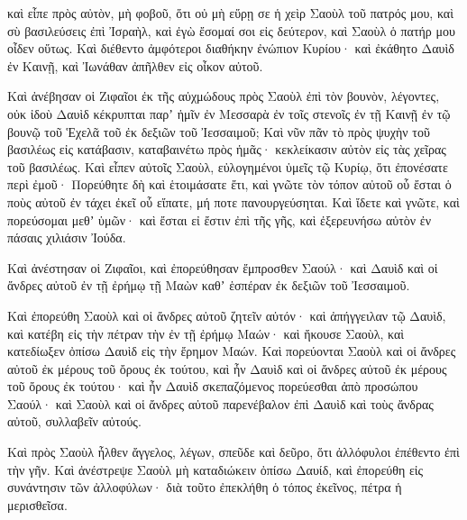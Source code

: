 {καὶ εἶπε πρὸς αὐτὸν, μὴ φοβοῦ, ὅτι οὐ μὴ εὕρῃ σε ἡ χεὶρ Σαοὺλ τοῦ πατρός μου, καὶ σὺ βασιλεύσεις ἐπὶ Ἰσραὴλ, καὶ ἐγὼ ἔσομαί σοι εἰς δεύτερον, καὶ Σαοὺλ ὁ πατήρ μου οἶδεν οὕτως.
Καὶ διέθεντο ἀμφότεροι διαθήκην ἐνώπιον Κυρίου· καὶ ἐκάθητο Δαυὶδ ἐν Καινῇ, καὶ Ἰωνάθαν ἀπῆλθεν εἰς οἶκον αὐτοῦ.
\par }{\PP {}Καὶ ἀνέβησαν οἱ Ζιφαῖοι ἐκ τῆς αὐχμώδους πρὸς Σαοὺλ ἐπὶ τὸν βουνὸν, λέγοντες, οὐκ ἰδοὺ Δαυὶδ κέκρυπται παρʼ ἡμῖν ἐν Μεσσαρὰ ἐν τοῖς στενοῖς ἐν τῇ Καινῇ ἐν τῷ βουνῷ τοῦ Ἑχελᾶ τοῦ ἐκ δεξιῶν τοῦ Ἰεσσαιμοῦ;
Καὶ νῦν πᾶν τὸ πρὸς ψυχὴν τοῦ βασιλέως εἰς κατάβασιν, καταβαινέτω πρὸς ἡμᾶς· κεκλείκασιν αὐτὸν εἰς τὰς χεῖρας τοῦ βασιλέως.
Καὶ εἶπεν αὐτοῖς Σαοὺλ, εὐλογημένοι ὑμεῖς τῷ Κυρίῳ, ὅτι ἐπονέσατε περὶ ἐμοῦ·
Πορεύθητε δὴ καὶ ἑτοιμάσατε ἔτι, καὶ γνῶτε τὸν τόπον αὐτοῦ οὗ ἔσται ὁ ποὺς αὐτοῦ ἐν τάχει ἐκεῖ οὗ εἴπατε, μή ποτε πανουργεύσηται.
Καὶ ἴδετε καὶ γνῶτε, καὶ πορεύσομαι μεθʼ ὑμῶν· καὶ ἔσται εἰ ἔστιν ἐπὶ τῆς γῆς, καὶ ἐξερευνήσω αὐτὸν ἐν πάσαις χιλιάσιν Ἰούδα.
\par }{\PP {}Καὶ ἀνέστησαν οἱ Ζιφαῖοι, καὶ ἐπορεύθησαν ἔμπροσθεν Σαούλ· καὶ Δαυὶδ καὶ οἱ ἄνδρες αὐτοῦ ἐν τῇ ἐρήμῳ τῇ Μαὼν καθʼ ἑσπέραν ἐκ δεξιῶν τοῦ Ἰεσσαιμοῦ.
\par }{\PP {}Καὶ ἐπορεύθη Σαοὺλ καὶ οἱ ἄνδρες αὐτοῦ ζητεῖν αὐτόν· καὶ ἀπήγγειλαν τῷ Δαυὶδ, καὶ κατέβη εἰς τὴν πέτραν τὴν ἐν τῇ ἐρήμῳ Μαών· καὶ ἤκουσε Σαοὺλ, καὶ κατεδίωξεν ὀπίσω Δαυὶδ εἰς τὴν ἔρημον Μαών.
Καὶ πορεύονται Σαοὺλ καὶ οἱ ἄνδρες αὐτοῦ ἐκ μέρους τοῦ ὄρους ἐκ τούτου, καὶ ἦν Δαυὶδ καὶ οἱ ἄνδρες αὐτοῦ ἐκ μέρους τοῦ ὄρους ἐκ τούτου· καὶ ἦν Δαυὶδ σκεπαζόμενος πορεύεσθαι ἀπὸ προσώπου Σαούλ· καὶ Σαοὺλ καὶ οἱ ἄνδρες αὐτοῦ παρενέβαλον ἐπὶ Δαυὶδ καὶ τοὺς ἄνδρας αὐτοῦ, συλλαβεῖν αὐτούς.
\par }{\PP {}Καὶ πρὸς Σαοὺλ ἦλθεν ἄγγελος, λέγων, σπεῦδε καὶ δεῦρο, ὅτι ἀλλόφυλοι ἐπέθεντο ἐπὶ τὴν γῆν.
Καὶ ἀνέστρεψε Σαοὺλ μὴ καταδιώκειν ὀπίσω Δαυίδ, καὶ ἐπορεύθη εἰς συνάντησιν τῶν ἀλλοφύλων· διὰ τοῦτο ἐπεκλήθη ὁ τόπος ἐκεῖνος, πέτρα ἡ μερισθεῖσα.

}

